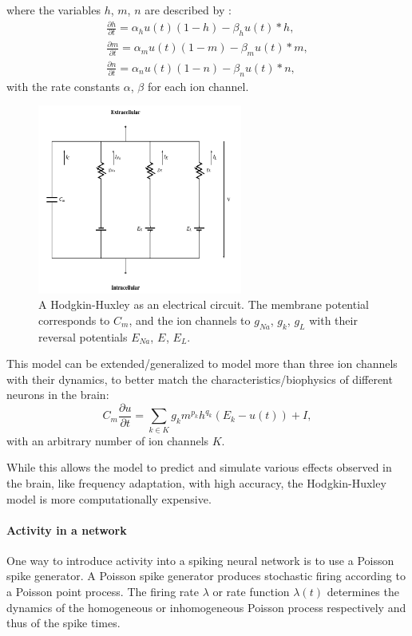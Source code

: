 where the variables $h$, $m$, $n$  are described by :
\[
\begin{split}
	\frac{\partial h}{\partial t} = \alpha_h u(t) (1-h) - \beta_h u(t) * h , \\
	\frac{\partial m}{\partial t} = \alpha_m u(t) (1-m) - \beta_m u(t) * m , \\
	\frac{\partial n}{\partial t} = \alpha_n u(t) (1-n) - \beta_n u(t) * n ,
\end{split}
\]
with the rate constants $\alpha$, $\beta$ for each ion channel.

\begin{figure}
	\centering
    	\includegraphics[width=0.6\textwidth]{imgs/hode_hux.png} 
    \caption{A Hodgkin-Huxley as an electrical circuit. The membrane potential corresponds to $C_m$, and the ion channels to $g_{Na}$, $g_{k}$, $g_{L}$ with their reversal potentials $E_{Na}$, $E_{}$, $E_{L}$.}
	\label{fig:hogdehux}
\end{figure}

This model can be extended/generalized to model more than three ion channels with their dynamics, to better match the characteristics/biophysics of different neurons in the brain:
\[
C_m \frac{\partial u}{\partial t} = \sum_{k \in K} g_k m^{p_k} h^{q_k} (E_k - u(t)) + I,
\]
with an arbitrary number of ion channels $K$.

While this allows the model to predict and simulate various effects observed in the brain, like frequency adaptation, with high accuracy, the Hodgkin-Huxley model is more computationally expensive.

\paragraph{Activity in a network}

One way to introduce activity into a spiking neural network is to use a Poisson spike generator.
A Poisson spike generator produces stochastic firing according to a Poisson point process.
The firing rate $\lambda$ or rate function $\lambda(t)$ determines the dynamics of the homogeneous or inhomogeneous Poisson process respectively and thus of the spike times.   

